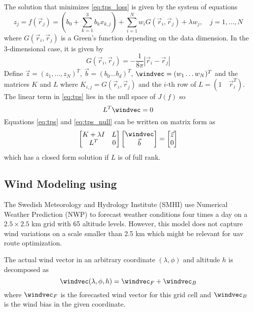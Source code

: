 The solution that minimizes \eqref{eq:tps_loss} is given by the system of equations
\begin{equation}\label{eq:tps}
    z_j = f(\vec{r}_j) =   \left( b_0 + \sum_{k=1}^3 b_kx_{k,j} \right) +\sum_{i=1}^Nw_iG(\vec{r}_i,\vec{r}_j)+ \lambda w_j, \quad j=1,\ldots,N
\end{equation}
where $G(\vec{r}_i,\vec{r}_j)$ is a Green's function depending on the data dimension. In the 3-dimensional case, it is given by
\begin{equation}
    G(\vec{r}_i,\vec{r}_j)=-\frac{1}{8\pi}|\vec{r}_i-\vec{r}_j|
\end{equation}
Define $\vec{z}=(z_1,\ldots,z_N)^T$, $\vec{b}=(b_0 \ldots b_d)^T$, $\windvec=(w_1 \ldots w_N)^T$ and the matrices $K$ and $L$ where $K_{i,j}=G(\vec{r}_i,\vec{r}_j)$ and the $i$-th row of $L=(1\quad \vec{r}_i^T)$. The linear term in \eqref{eq:tps} lies in the null space of $J(f)$ so 
\begin{equation}\label{eq:tps_null}
    L^T\windvec=0
\end{equation}
Equations \eqref{eq:tps} and \eqref{eq:tps_null} can be written on matrix form as
\begin{equation}\label{eq:tps_closed_form}
    \begin{bmatrix}
        K+\lambda I & L \\
        L^T & 0
    \end{bmatrix}
    \begin{bmatrix}
        \windvec \\
        \vec{b}
    \end{bmatrix}
    =
    \begin{bmatrix}
        \vec{z} \\
        0
    \end{bmatrix}
\end{equation}
which has a closed form solution if $L$ is of full rank.
\subsection{Wind Modeling using \abbrTPS}
The Swedish Meteorology and Hydrology Institute (SMHI) use Numerical Weather Prediction (NWP) to forecast weather conditions four times a day on a $2.5\times2.5$ km grid with 65 altitude levels. However, this model does not capture wind variations on a scale smaller than 2.5 km which might be relevant for \ac{uav} route optimization.

The actual wind vector in an arbitrary coordinate $(\lambda,\phi)$ and altitude $h$ is decomposed as 
\begin{equation}
    \windvec(\lambda,\phi,h)=\windvec_F + \windvec_B
\end{equation}
where $\windvec_F$ is the forecasted wind vector for this grid cell and $\windvec_B$ is the wind bias in the given coordinate.

